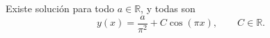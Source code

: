 Existe solución para todo \(a\in\mathbb R\), y todas son
\[y(x)=\frac a{\pi^2}+C\cos(\pi x),\qquad C\in\mathbb R.\]
